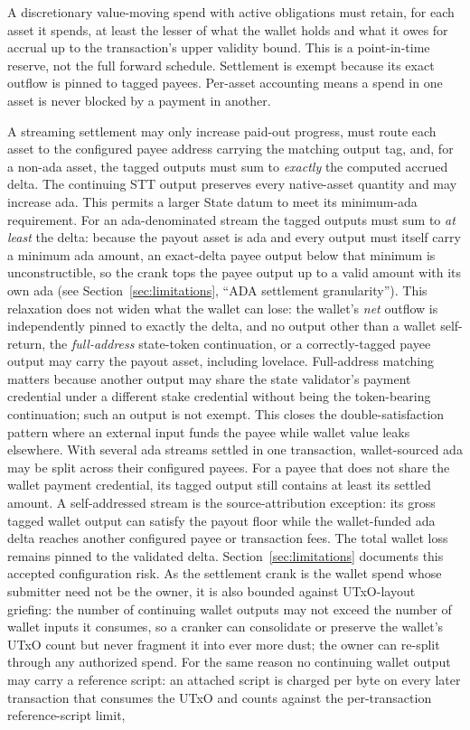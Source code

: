 \documentclass[11pt,DIV=11,parskip=half-]{scrartcl}
\begin{document}
\begin{description}[leftmargin=1.4em,style=nextline]
\item[Streaming reserve, per asset.] A discretionary value-moving spend with active obligations must retain, for each asset it spends, at least the lesser of what the wallet holds and what it owes for accrual up to the transaction's upper validity bound. This is a point-in-time reserve, not the full forward schedule. Settlement is exempt because its exact outflow is pinned to tagged payees. Per-asset accounting means a spend in one asset is never blocked by a payment in another.
\item[Payout integrity.] A streaming settlement may only increase paid-out progress, must route each asset to the configured payee address carrying the matching output tag, and, for a non-ada asset, the tagged outputs must sum to \emph{exactly} the computed accrued delta. The continuing STT output preserves every native-asset quantity and may increase ada. This permits a larger State datum to meet its minimum-ada requirement. For an ada-denominated stream the tagged outputs must sum to \emph{at least} the delta: because the payout asset is ada and every output must itself carry a minimum ada amount, an exact-delta payee output below that minimum is unconstructible, so the crank tops the payee output up to a valid amount with its own ada (see Section~\ref{sec:limitations}, ``ADA settlement granularity''). This relaxation does not widen what the wallet can lose: the wallet's \emph{net} outflow is independently pinned to exactly the delta, and no output other than a wallet self-return, the \emph{full-address} state-token continuation, or a correctly-tagged payee output may carry the payout asset, including lovelace. Full-address matching matters because another output may share the state validator's payment credential under a different stake credential without being the token-bearing continuation; such an output is not exempt. This closes the double-satisfaction pattern where an external input funds the payee while wallet value leaks elsewhere. With several ada streams settled in one transaction, wallet-sourced ada may be split across their configured payees. For a payee that does not share the wallet payment credential, its tagged output still contains at least its settled amount. A self-addressed stream is the source-attribution exception: its gross tagged wallet output can satisfy the payout floor while the wallet-funded ada delta reaches another configured payee or transaction fees. The total wallet loss remains pinned to the validated delta. Section~\ref{sec:limitations} documents this accepted configuration risk. As the settlement crank is the wallet spend whose submitter need not be the owner, it is also bounded against UTxO-layout griefing: the number of continuing wallet outputs may not exceed the number of wallet inputs it consumes, so a cranker can consolidate or preserve the wallet's UTxO count but never fragment it into ever more dust; the owner can re-split through any authorized spend. For the same reason no continuing wallet output may carry a reference script: an attached script is charged per byte on every later transaction that consumes the UTxO and counts against the per-transaction reference-script limit, 
\end{description}
\end{document}
